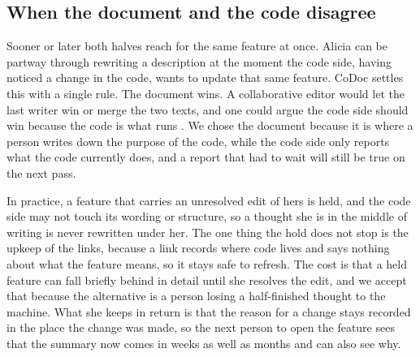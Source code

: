 \subsection{When the document and the code disagree}

Sooner or later both halves reach for the same feature at once.
Alicia can be partway through rewriting a description at the moment the code side, having noticed a change in the code, wants to update that same feature.
CoDoc settles this with a single rule.
The document wins.
A collaborative editor would let the last writer win or merge the two texts, and one could argue the code side should win because the code is what runs \citep{crdt}.
We chose the document because it is where a person writes down the purpose of the code, while the code side only reports what the code currently does, and a report that had to wait will still be true on the next pass.

In practice, a feature that carries an unresolved edit of hers is held, and the code side may not touch its wording or structure, so a thought she is in the middle of writing is never rewritten under her.
The one thing the hold does not stop is the upkeep of the links, because a link records where code lives and says nothing about what the feature means, so it stays safe to refresh.
The cost is that a held feature can fall briefly behind in detail until she resolves the edit, and we accept that because the alternative is a person losing a half-finished thought to the machine.
What she keeps in return is that the reason for a change stays recorded in the place the change was made, so the next person to open the feature sees that the summary now comes in weeks as well as months and can also see why.
